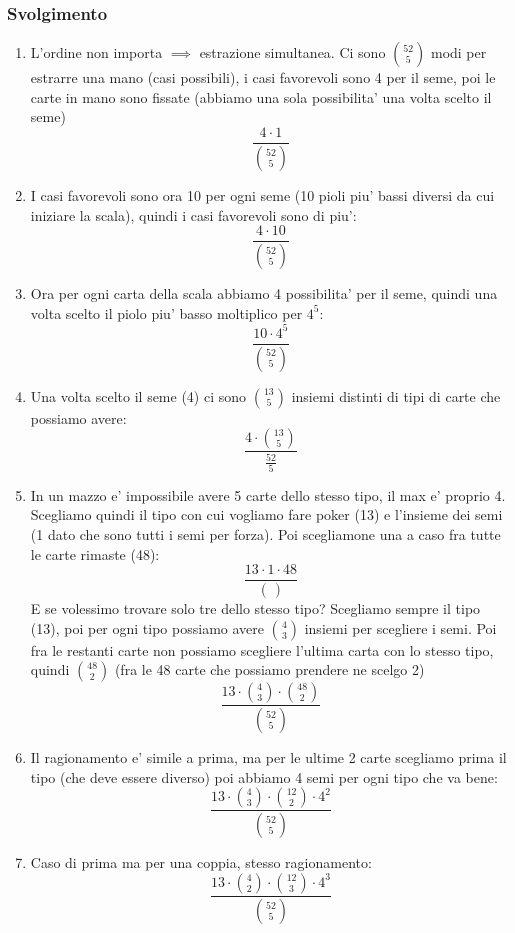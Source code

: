 \subsubsection{Svolgimento}

\begin{enumerate}[label=(\alph*)]
  \item L'ordine non importa $ \implies $ estrazione simultanea. Ci sono $ \binom{52}{5} $ modi per estrarre una mano (casi possibili), i casi favorevoli sono 4 per il seme, poi le carte in mano sono fissate (abbiamo una sola possibilita' una volta scelto il seme)
    \[
      \frac{4 \cdot 1}{\binom{52}{5}}
    \]
  \item I casi favorevoli sono ora 10 per ogni seme (10 pioli piu' bassi diversi da cui iniziare la scala), quindi i casi favorevoli sono di piu':
    \[
      \frac{4 \cdot 10}{\binom{52}{5}}
    \]
  \item Ora per ogni carta della scala abbiamo 4 possibilita' per il seme, quindi una volta scelto il piolo piu' basso moltiplico per $ 4^5 $:
    \[
      \frac{10 \cdot 4^5}{\binom{52}{5}}
    \]
  \item Una volta scelto il seme (4) ci sono $ \binom{13}{5} $ insiemi distinti di tipi di carte che possiamo avere:
    \[
      \frac{4 \cdot \binom{13}{5}}{\frac{52}{5}}
    \]
  \item In un mazzo e' impossibile avere 5 carte dello stesso tipo, il max e' proprio 4. Scegliamo quindi il tipo con cui vogliamo fare poker (13) e l'insieme dei semi (1 dato che sono tutti i semi per forza). Poi scegliamone una a caso fra tutte le carte rimaste (48):
    \[
      \frac{13 \cdot 1 \cdot 48}{\binom{}{}}
    \]
    E se volessimo trovare solo tre dello stesso tipo? Scegliamo sempre il tipo (13), poi per ogni tipo possiamo avere $ \binom{4}{3} $ insiemi per scegliere i semi. Poi fra le restanti carte non possiamo scegliere l'ultima carta con lo stesso tipo, quindi $ \binom{48}{2} $ (fra le 48 carte che possiamo prendere ne scelgo 2)
    \[
      \frac{13 \cdot \binom{4}{3} \cdot \binom{48}{2}}{\binom{52}{5}}
    \]
  \item Il ragionamento e' simile a prima, ma per le ultime 2 carte scegliamo prima il tipo (che deve essere diverso) poi abbiamo 4 semi per ogni tipo che va bene:
    \[
      \frac{13 \cdot \binom{4}{3} \cdot \binom{12}{2} \cdot 4^2}{\binom{52}{5}}
    \]
  \item Caso di prima ma per una coppia, stesso ragionamento:
    \[
      \frac{13 \cdot \binom{4}{2} \cdot \binom{12}{3} \cdot 4^3}{\binom{52}{5}}
    \]
\end{enumerate}

